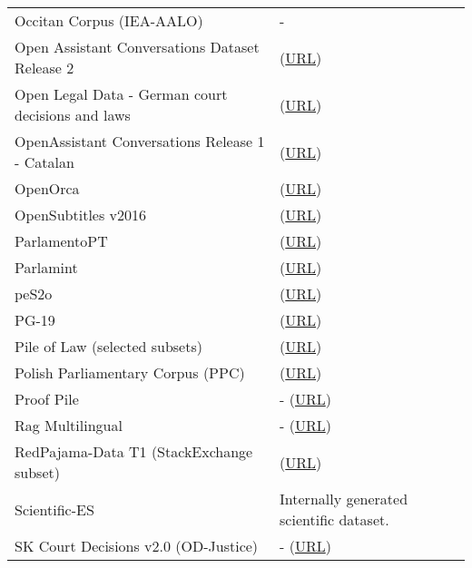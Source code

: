 \begin{longtable}{p{} | p{}}
    Occitan Corpus (IEA-AALO) & - \\ 
    Open Assistant Conversations Dataset Release 2 & \citet{köpf_openassistant_2023} (\href{https://huggingface.co/datasets/OpenAssistant/oasst2}{URL}) \\ 
    Open Legal Data - German court decisions and laws & \citet{ostendorff_towards_2020} (\href{https://openlegaldata.io/}{URL}) \\ 
    OpenAssistant Conversations Release 1 - Catalan & \citet{köpf_openassistant_2023} (\href{https://huggingface.co/datasets/projecte-aina/oasst1_ca}{URL}) \\ 
    OpenOrca & \citet{lian_openorca_2023} (\href{https://huggingface.co/datasets/Open-Orca/OpenOrca}{URL}) \\ 
    OpenSubtitles v2016  & \citet{lison_opensubtitles2016_2016} (\href{https://opus.nlpl.eu/OpenSubtitles-v2016.php}{URL}) \\ 
    ParlamentoPT & \citet{rodrigues_advancing_2023} (\href{https://huggingface.co/datasets/PORTULAN/parlamento-pt}{URL}) \\ 
    Parlamint & \citet{erjavec_linguistically_2021} (\href{https://www.clarin.eu/parlamint}{URL}) \\ 
    peS2o & \citet{soldaini_pes2o_2023} (\href{https://huggingface.co/datasets/allenai/peS2o}{URL}) \\ 
    PG-19 & \citet{rae_compressive_2019} (\href{https://huggingface.co/datasets/deepmind/pg19}{URL}) \\ 
    Pile of Law (selected subsets) & \citet{henderson_pile_2022} (\href{https://huggingface.co/datasets/pile-of-law/pile-of-law}{URL}) \\ 
    Polish Parliamentary Corpus (PPC) & \citet{ogrodniczuk_polish_2018} (\href{http://clip.ipipan.waw.pl/PPC}{URL}) \\ 
    Proof Pile & - (\href{https://huggingface.co/datasets/hoskinson-center/proof-pile}{URL}) \\ 
    Rag Multilingual & - (\href{https://huggingface.co/datasets/projecte-aina/RAG_Multilingual}{URL}) \\ 
    RedPajama-Data T1 (StackExchange subset) & \citet{computer_redpajama_2023} (\href{https://huggingface.co/datasets/togethercomputer/RedPajama-Data-1T}{URL}) \\ 
    Scientific-ES & Internally generated scientific dataset. \\ 
    SK Court Decisions v2.0 (OD-Justice) & - (\href{https://www.juls.savba.sk/data/od-justice}{URL}) \\ 

\end{longtable}
